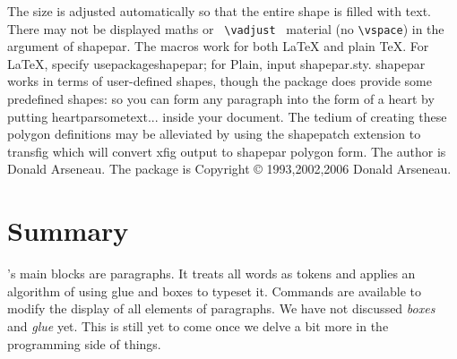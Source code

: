 The size is adjusted automatically so that the entire shape is filled with text. There may not be displayed maths or \verb+ \vadjust +  material (no \verb+\vspace+) in the argument of shapepar. The macros work for both LaTeX and plain TeX. For LaTeX, specify usepackage{shapepar}; for Plain, input shapepar.sty.
shapepar works in terms of user-defined shapes, though the package does provide some predefined shapes: so you can form any paragraph into the form of a heart by putting heartpar{sometext...} inside your document. The tedium of creating these polygon definitions may be alleviated by using the shapepatch extension to transfig which will convert xfig output to shapepar polygon form.
The author is Donald Arseneau. The package is Copyright  © 1993,2002,2006 Donald Arseneau.



\newcommand{\abc}{abcdefghijklmnopqrstuvwxyz}


\section{Summary}
\tex's main blocks are paragraphs. It treats all words as tokens and applies an algorithm of using glue and boxes to typeset it. Commands are available  to modify the display of all elements of paragraphs. We have not discussed {\em boxes} and {\em glue} yet. This is still yet to come once we delve a bit more in the programming side of things.

